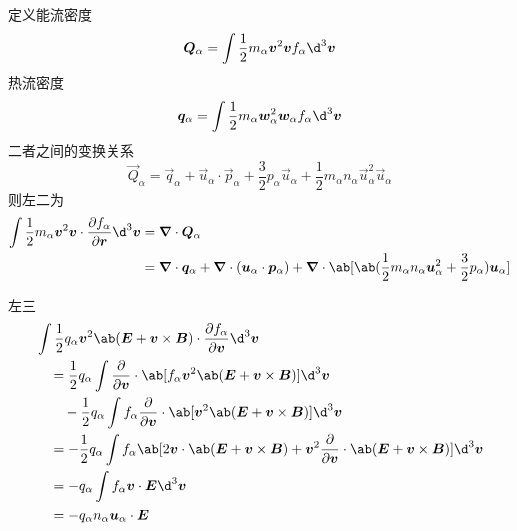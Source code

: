 定义能流密度
\begin{equation}
\vec{Q}_\alpha = \int \frac{1}{2} m_\alpha \vec{v}^2 \vec{v} f_\alpha \d^3 \vec{v}
\end{equation}
热流密度
\begin{equation}
\vec{q}_\alpha = \int \frac{1}{2} m_\alpha \vec{w}_\alpha^2 \vec{w}_\alpha f_\alpha \d^3 \vec{v}
\end{equation}
二者之间的变换关系
\begin{equation}
\vec{Q}_\alpha = \vec{q}_\alpha + \vec{u}_\alpha \cdot \vec{p}_\alpha
+ \frac{3}{2} p_\alpha \vec{u}_\alpha + \frac{1}{2} m_\alpha n_\alpha \vec{u}_\alpha^2 \vec{u}_\alpha
\end{equation}
则左二为
\begin{equation}\begin{aligned}
\int \frac{1}{2} m_\alpha \vec{v}^2 \vec{v} \cdot \pdv{f_\alpha}{\vec{r}} \d^3 \vec{v}
&= \dive{\vec{Q}_\alpha} \\
&= \dive{\vec{q}_\alpha} + \dive{(\vec{u}_\alpha \cdot \vec{p}_\alpha)}
+ \dive{\ab[\ab(\frac{1}{2} m_\alpha n_\alpha \vec{u}_\alpha^2 + \frac{3}{2} p_\alpha ) \vec{u}_\alpha]}
\end{aligned}\end{equation}

左三
\begin{equation}\begin{aligned}
&\int \frac{1}{2} q_\alpha \vec{v}^2 \ab( \vec{E} + \vec{v} \times \vec{B} ) \cdot \pdv{f_\alpha}{\vec{v}} \d^3 \vec{v} \\
& \quad = \frac{1}{2} q_\alpha \int \pdv{}{\vec{v}} \cdot \ab[
    f_\alpha \vec{v}^2 \ab( \vec{E} + \vec{v} \times \vec{B} )
] \d^3 \vec{v} \\
&  \quad\quad - \frac{1}{2} q_\alpha \int f_\alpha \pdv{}{\vec{v}} \cdot \ab[
    \vec{v}^2 \ab( \vec{E} + \vec{v} \times \vec{B} )
] \d^3 \vec{v} \\
& \quad = - \frac{1}{2} q_\alpha \int f_\alpha \ab[
    2 \vec{v} \cdot \ab( \vec{E} + \vec{v} \times \vec{B} )
    + \vec{v}^2 \pdv{}{\vec{v}} \cdot \ab( \vec{E} + \vec{v} \times \vec{B} )
] \d^3 \vec{v} \\
& \quad = - q_\alpha \int f_\alpha \vec{v} \cdot \vec{E} \d^3 \vec{v} \\
& \quad = - q_\alpha n_\alpha \vec{u}_\alpha \cdot \vec{E}
\end{aligned}\end{equation}

